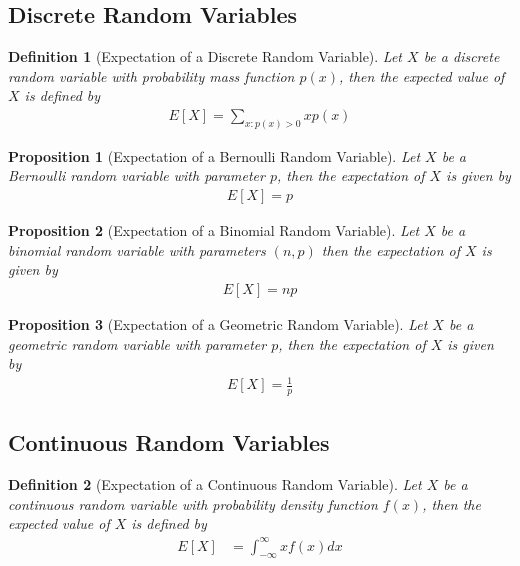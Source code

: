 \documentclass[11pt, oneside]{book}   	%
\newtheorem{definition}{Definition}[chapter]
\newtheorem{proposition}{Proposition}[chapter]
\begin{document}
\begin{spacing}{1.618}
\subsection{Discrete Random Variables}

\begin{definition}[Expectation of a Discrete Random Variable]
	Let $X$ be a discrete random variable with probability mass function $p(x)$, then the \emph{expected value} of $X$ is defined by
	\begin{alignat}{4}
		E[X]=\sum_{x:p(x)>0} xp(x)
	\end{alignat}
\end{definition}

\begin{proposition}[Expectation of a Bernoulli Random Variable]
	Let $X$ be a Bernoulli random variable with parameter $p$, then the expectation of $X$ is given by
	\begin{alignat}{4}
		E[X]=p
	\end{alignat}
\end{proposition}

\begin{proposition}[Expectation of a Binomial Random Variable]
	Let $X$ be a binomial random variable with parameters $(n, p)$ then the expectation of $X$ is given by 
	\begin{alignat}{4}
		E[X]=np
	\end{alignat}
\end{proposition}

\begin{proposition}[Expectation of a Geometric Random Variable]
	Let $X$ be a geometric random variable with parameter $p$, then the expectation of $X$ is given by 
	\begin{alignat}{4}
		E[X]=\frac{1}{p}
	\end{alignat}
\end{proposition}

\subsection{Continuous Random Variables}
\begin{definition}[Expectation of a Continuous Random Variable]
	Let $X$ be a continuous random variable with probability density function $f(x)$, then the \emph{expected value} of $X$ is defined by
	\begin{alignat}{4}
		E[X]&=\int_{-\infty}^\infty xf(x)dx
	\end{alignat}
\end{definition}


\end{spacing}
\end{document}
